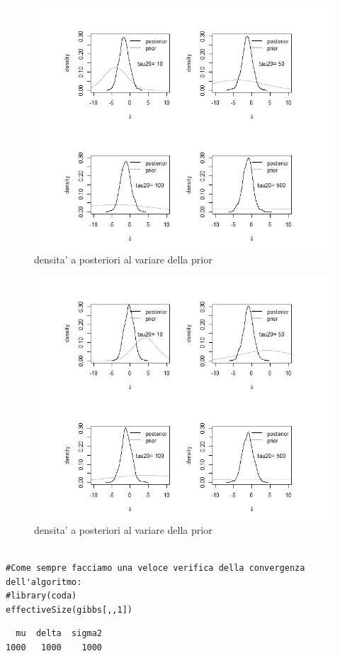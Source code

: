 \begin{itemize}
\begin{lstlisting}[style=R]
\end{lstlisting}
\begin{figure}
 \centering
 \includegraphics[scale=0.7]{img/figura13}
 \caption{densita' a posteriori al variare della prior}
 \label{figure:figura13}
\end{figure}

\begin{figure}
 \centering
 \includegraphics[scale=0.7]{img/figura14}
 \caption{densita' a posteriori al variare della prior}
 \label{figure:figura14}
\end{figure}
\begin{lstlisting}[style=R]

#Come sempre facciamo una veloce verifica della convergenza dell'algoritmo:
#library(coda)
effectiveSize(gibbs[,,1])
\end{lstlisting}

{
\color{red}
\begin{Verbatim}
  mu  delta  sigma2
1000   1000    1000
\end{Verbatim}
}



\end{itemize}

